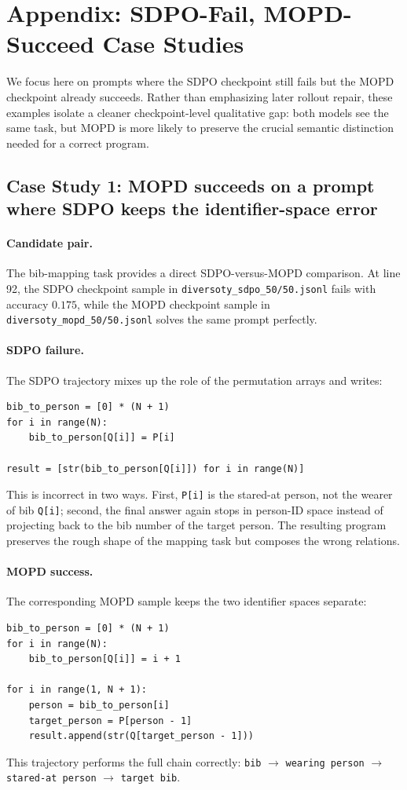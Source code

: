 \section{Appendix: SDPO-Fail, MOPD-Succeed Case Studies}
\label{sec:appendix-case-studies}

We focus here on prompts where the SDPO checkpoint still fails but the MOPD
checkpoint already succeeds.
Rather than emphasizing later rollout repair, these examples isolate a cleaner
checkpoint-level qualitative gap: both models see the same task, but MOPD is
more likely to preserve the crucial semantic distinction needed for a correct
program.

\subsection{Case Study 1: MOPD succeeds on a prompt where SDPO keeps the identifier-space error}

\paragraph{Candidate pair.}
The bib-mapping task provides a direct SDPO-versus-MOPD comparison.
At line 92, the SDPO checkpoint sample in
\texttt{diversoty\_sdpo\_50/50.jsonl} fails with accuracy $0.175$,
while the MOPD checkpoint sample in
\texttt{diversoty\_mopd\_50/50.jsonl} solves the same prompt perfectly.

\paragraph{SDPO failure.}
The SDPO trajectory mixes up the role of the permutation arrays and writes:
\begin{verbatim}
bib_to_person = [0] * (N + 1)
for i in range(N):
    bib_to_person[Q[i]] = P[i]

result = [str(bib_to_person[Q[i]]) for i in range(N)]
\end{verbatim}
This is incorrect in two ways.
First, \texttt{P[i]} is the stared-at person, not the wearer of bib
\texttt{Q[i]}; second, the final answer again stops in person-ID space instead
of projecting back to the bib number of the target person.
The resulting program preserves the rough shape of the mapping task but
composes the wrong relations.

\paragraph{MOPD success.}
The corresponding MOPD sample keeps the two identifier spaces separate:
\begin{verbatim}
bib_to_person = [0] * (N + 1)
for i in range(N):
    bib_to_person[Q[i]] = i + 1

for i in range(1, N + 1):
    person = bib_to_person[i]
    target_person = P[person - 1]
    result.append(str(Q[target_person - 1]))
\end{verbatim}
This trajectory performs the full chain correctly:
\texttt{bib} $\rightarrow$ \texttt{wearing person}
$\rightarrow$ \texttt{stared-at person}
$\rightarrow$ \texttt{target bib}.

